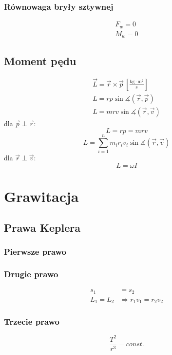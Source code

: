 \documentclass{report}
\numberwithin{equation}{chapter}
\newcommand{\unit}[1]{\,\left[\mathrm{#1}\right]}
\begin{document}
      \subsection{Równowaga bryły sztywnej}
        \begin{gather}
          F_w = 0\\
          M_w = 0
        \end{gather}
    \section{Moment pędu}
      \begin{gather}
        \vec L = \vec r \times\vec p \unit{\frac{kg\cdot m^2}{s}}\\
        L = rp\sin\measuredangle(\vec r,\vec p)\\
        L = mrv\sin\measuredangle(\vec r,\vec v)
      \end{gather}
      dla $\vec p \perp \vec r$:
      \begin{equation}
        L = rp = mrv
      \end{equation}
      \begin{equation}
        L = \sum_{i=1}^n m_ir_iv_i\sin\measuredangle(\vec r,\vec v)
      \end{equation}
      dla $\vec r \perp \vec v$:
      \begin{equation}
        L = \omega I
      \end{equation}

  \newpage
  \chapter{Grawitacja}
    \section{Prawa Keplera}
      \subsection{Pierwsze prawo}
      \subsection{Drugie prawo}
        \begin{align}
          s_1 &= s_2\\
          L_1 = L_2 &\Rightarrow r_1v_1 = r_2v_2
        \end{align}
      \subsection{Trzecie prawo}
        \begin{equation}
          \frac{T^2}{r^3} = const.
        \end{equation}
\end{document}
